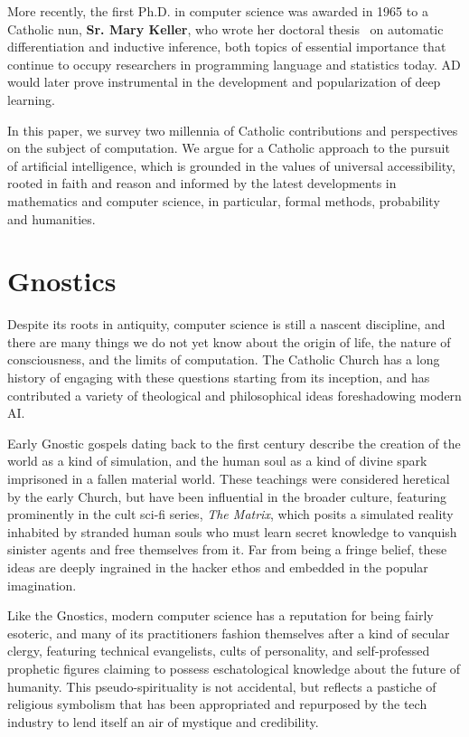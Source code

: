 \documentclass[sigplan,nonacm]{acmart}\settopmatter{printfolios=false,printccs=false,printacmref=false}
\begin{document}
  More recently, the first Ph.D. in computer science was awarded in 1965 to a Catholic nun, \textbf{Sr. Mary Keller}, who wrote her doctoral thesis~\cite{keller1965inductive} on automatic differentiation and inductive inference, both topics of essential importance that continue to occupy researchers in programming language and statistics today. AD would later prove instrumental in the development and popularization of deep learning.

  In this paper, we survey two millennia of Catholic contributions and perspectives on the subject of computation. We argue for a Catholic approach to the pursuit of artificial intelligence, which is grounded in the values of universal accessibility, rooted in faith and reason and informed by the latest developments in mathematics and computer science, in particular, formal methods, probability and humanities.

 \section{Gnostics}

  Despite its roots in antiquity, computer science is still a nascent discipline, and there are many things we do not yet know about the origin of life, the nature of consciousness, and the limits of computation. The Catholic Church has a long history of engaging with these questions starting from its inception, and has contributed a variety of theological and philosophical ideas foreshadowing modern AI.

  Early Gnostic gospels dating back to the first century describe the creation of the world as a kind of simulation, and the human soul as a kind of divine spark imprisoned in a fallen material world. These teachings were considered heretical by the early Church, but have been influential in the broader culture, featuring prominently in the cult sci-fi series, \textit{The Matrix}, which posits a simulated reality inhabited by stranded human souls who must learn secret knowledge to vanquish sinister agents and free themselves from it. Far from being a fringe belief, these ideas are deeply ingrained in the hacker ethos and embedded in the popular imagination.

  Like the Gnostics, modern computer science has a reputation for being fairly esoteric, and many of its practitioners fashion themselves after a kind of secular clergy, featuring technical evangelists, cults of personality, and self-professed prophetic figures claiming to possess eschatological knowledge about the future of humanity. This pseudo-spirituality is not accidental, but reflects a pastiche of religious symbolism that has been appropriated and repurposed by the tech industry to lend itself an air of mystique and credibility.
\end{document}
